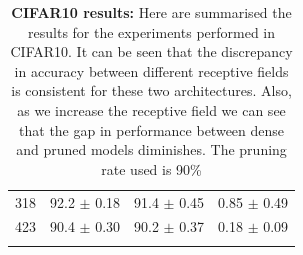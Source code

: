\begin{table}[H]
\begin{tabular}{@{}cccc@{}}
318                                          & 92.2 $\pm$ 0.18                                  & 91.4 $\pm$ 0.45                                   & 0.85 $\pm$ 0.49                                     \\
423                                          & 90.4 $\pm$  0.30                                 & 90.2 $\pm$ 0.37
                                             & 0.18 $\pm$ 0.09                                     \\ \bottomrule
                                             \\
\end{tabular}
\caption{\textbf{CIFAR10 results:} Here are summarised the results for the experiments performed in CIFAR10. It can be
  seen that the discrepancy in accuracy between different receptive fields is consistent for these two architectures.
  Also, as we increase the receptive field we can see that the gap in performance between dense and pruned models
diminishes. The pruning rate used is 90\%}
\label{tab:pruned_cifar10}
\end{table}


